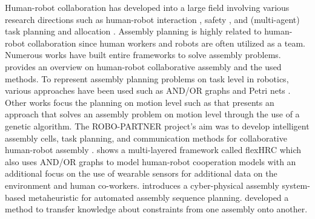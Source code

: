 Human-robot collaboration \cite{Bauer.2008,Goodrich.2008,Chandrasekaran.2015,Ajoudani.2018} has developed into a large field involving various research directions such as human-robot interaction \cite{Argall.2010,Villani.2018}, safety \cite{Maurtua.2017,Arents.2021,Valori.2021}, and (multi-agent) task planning and allocation \cite{Rosell.2004,Jia.2013,Alatartsev.2015,Khamis.2015,tsarouchi2016human}.
Assembly planning is highly related to human-robot collaboration since human workers and robots are often utilized as a team.
Numerous works have built entire frameworks to solve assembly problems.
\cite{wang2019symbiotic} provides an overview on human-robot collaborative assembly and the used methods.
To represent assembly planning problems on task level in robotics, various approaches have been used such as AND/OR graphs \cite{HomemdeMello.1990} and Petri nets \cite{zhang1989representation}.
Other works focus the planning on motion level such as \cite{bonert2000motion} that presents an approach that solves an assembly problem on motion level through the use of a genetic algorithm.
The ROBO-PARTNER project's aim was to develop intelligent assembly cells, task planning, and communication methods for collaborative human-robot assembly \cite{michalos2014robo}.
\cite{Darvish.2018} shows a multi-layered framework called flexHRC which also uses AND/OR graphs to model human-robot cooperation models with an additional focus on the use of wearable sensors for additional data on the environment and human co-workers.
\cite{ying2021cyber} introduces a cyber-physical assembly system-based metaheuristic for automated assembly sequence planning.
\cite{rodriguez2020pattern} developed a method to transfer knowledge about constraints from one assembly onto another.
